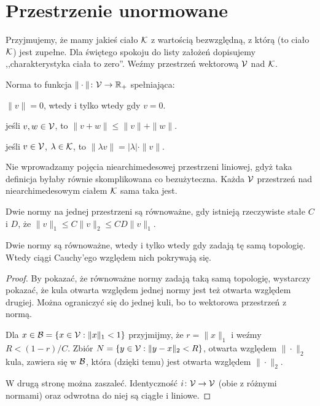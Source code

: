 \section{Przestrzenie unormowane}
Przyjmujemy, że mamy jakieś ciało $\mathcal K$ z wartością bezwzględną, z którą (to ciało $\mathcal K$) jest zupełne.
Dla świętego spokoju do listy założeń dopisujemy ,,charakterystyka ciała to zero''.
Weźmy przestrzeń wektorową $\mathcal V$ nad $\mathcal K$.

\begin{definicja}
	Norma to funkcja $\|\cdot\| \colon \mathcal V \to \mathbb R_+$ spełniająca:
	\begin{enumx}
	\item $\|v\| = 0$, wtedy i tylko wtedy gdy $v = 0$.
	\item jeśli $v, w \in \mathcal V$, to $\|v+w\| \le \|v\| + \|w\|$.
	\item jeśli $v \in \mathcal V$, $\lambda \in \mathcal K$, to $\|\lambda v\| = |\lambda| \cdot \|v\|$.
	\end{enumx}
\end{definicja}

Nie wprowadzamy pojęcia niearchimedesowej przestrzeni liniowej, gdyż taka definicja byłaby równie skomplikowana co bezużyteczna.
Każda $\mathcal V$ przestrzeń nad niearchimedesowym ciałem $\mathcal K$ sama taka jest.

\begin{definicja}
	Dwie normy na jednej przestrzeni są równoważne, gdy istnieją rzeczywiste stałe $C$ i $D$, że $\|v\|_1 \le C\|v\|_2 \le CD \|v\|_1$.
\end{definicja}

\begin{fakt}
	Dwie normy są równoważne, wtedy i tylko wtedy gdy zadają tę samą topologię.
	Wtedy ciągi Cauchy'ego względem nich pokrywają się.
\end{fakt}

\begin{proof}
	By pokazać, że równoważne normy zadają taką samą topologię, wystarczy pokazać, że kula otwarta względem jednej normy jest też otwarta względem drugiej.
	Można ograniczyć się do jednej kuli, bo to wektorowa przestrzeń z normą.

	Dla $x \in \mathcal B = \{x \in \mathcal V : \|x\|_1 < 1\}$ przyjmijmy, że $r = \|x\|_1$ i weźmy $R < (1-r) / C$.
	Zbiór $N = \{y \in \mathcal V : \|y-x\|_2 < R\}$, otwarta względem $\|\cdot\|_2$ kula, zawiera się w $\mathcal B$, która (dzięki temu) jest otwarta względem $\|\cdot\|_2$.

	W drugą stronę można zaszaleć.
	Identyczność $i \colon \mathcal V \to \mathcal V$ (obie z różnymi normami) oraz odwrotna do niej są ciągłe i liniowe.
\end{proof}

